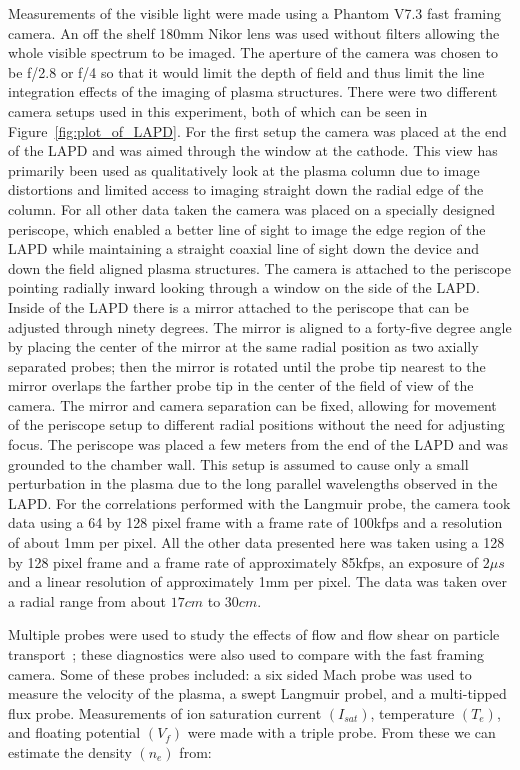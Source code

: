\documentclass[%
 reprint,
 amsmath,amssymb,
 aps,
]{revtex4-1}
\begin{document}
Measurements of the visible light were made using a Phantom V7.3 fast framing camera. An off the shelf 180mm Nikor lens was used without filters allowing the whole visible spectrum to be imaged. The aperture of the camera was chosen to be f/2.8 or f/4 so that it would limit the depth of field and thus limit the line integration effects of the imaging of plasma structures. There were two different camera setups used in this experiment, both of which can be seen in Figure~\ref{fig:plot_of_LAPD}.  For the first setup the camera was placed at the end of the LAPD and was aimed through the window at the cathode.  This view has primarily been used as qualitatively look at the plasma column due to image distortions and limited access to imaging straight down the radial edge of the column.  For all other data taken the camera was placed on a specially designed periscope, which enabled a better line of sight to image the edge region of the LAPD while maintaining a straight coaxial line of sight down the device and down the field aligned plasma structures. The camera is attached to the periscope pointing radially inward looking through a window on the side of the LAPD. Inside of the LAPD there is a mirror attached to the periscope that can be adjusted through ninety degrees. The mirror is aligned to a forty-five degree angle by placing the center of the mirror at the same radial position as two axially separated probes; then the mirror is rotated until the probe tip nearest to the mirror overlaps the farther probe tip in the center of the field of view of the camera. The mirror and camera separation can be fixed, allowing for movement of the periscope setup to different radial positions without the need for adjusting focus.  The periscope was placed a few meters from the end of the LAPD and was grounded to the chamber wall.  This setup is assumed to cause only a small perturbation in the plasma due to the long parallel wavelengths observed in the LAPD.  For the correlations performed with the Langmuir probe, the camera took data using a 64 by 128 pixel frame with a frame rate of 100kfps and a resolution of about 1mm per pixel.  All the other data presented here was taken using a 128 by 128 pixel frame and a frame rate of approximately 85kfps, an exposure of $2 \mu s$ and a linear resolution of approximately 1mm per pixel.  The data was taken over a radial range from about $17cm$ to $30cm$.
 
Multiple probes were used to study the effects of flow and flow shear on particle transport~\cite{schaffner12, schaffner13}; these diagnostics were also used to compare with the fast framing camera. Some of these probes included: a six sided Mach probe was used to measure the velocity of the plasma, a swept Langmuir probel, and a multi-tipped flux probe. Measurements of ion saturation current $(I_{sat})$, temperature $(T_e)$, and floating potential $(V_f)$ were made with a triple probe. From these we can estimate the density $(n_e)$ from:
\end{document}
